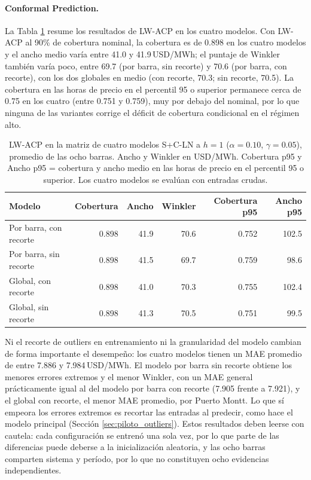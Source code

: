 \paragraph{Conformal Prediction.} La Tabla \ref{tab:matriz_outliers_cp} resume los resultados de LW-ACP en los cuatro modelos. Con LW-ACP al 90\% de cobertura nominal, la cobertura es de 0.898 en los cuatro modelos y el ancho medio varía entre 41.0 y 41.9\,USD/MWh; el puntaje de Winkler también varía poco, entre 69.7 (por barra, sin recorte) y 70.6 (por barra, con recorte), con los dos globales en medio (con recorte, 70.3; sin recorte, 70.5). La cobertura en las horas de precio en el percentil 95 o superior permanece cerca de 0.75 en los cuatro (entre 0.751 y 0.759), muy por debajo del nominal, por lo que ninguna de las variantes corrige el déficit de cobertura condicional en el régimen alto.

\begin{table}[htbp]
    \centering
    \begin{tabular}{lrrrrr}
        \toprule
        Modelo & Cobertura & Ancho & Winkler & Cobertura p95 & Ancho p95 \\
        \midrule
        Por barra, con recorte & 0.898 & 41.9 & 70.6 & 0.752 & 102.5 \\
        Por barra, sin recorte & 0.898 & 41.5 & 69.7 & 0.759 & 98.6 \\
        Global, con recorte    & 0.898 & 41.0 & 70.3 & 0.755 & 102.4 \\
        Global, sin recorte    & 0.898 & 41.3 & 70.5 & 0.751 & 99.5 \\
        \bottomrule
    \end{tabular}
    \vspace{0.2cm}
    \caption{LW-ACP en la matriz de cuatro modelos S+C-LN a $h=1$ ($\alpha=0.10$, $\gamma=0.05$), promedio de las ocho barras. Ancho y Winkler en USD/MWh. Cobertura p95 y Ancho p95 = cobertura y ancho medio en las horas de precio en el percentil 95 o superior. Los cuatro modelos se evalúan con entradas crudas.}
    \label{tab:matriz_outliers_cp}
\end{table}

Ni el recorte de outliers en entrenamiento ni la granularidad del modelo cambian de forma importante el desempeño: los cuatro modelos tienen un MAE promedio de entre 7.886 y 7.984\,USD/MWh. El modelo por barra sin recorte obtiene los menores errores extremos y el menor Winkler, con un MAE general prácticamente igual al del modelo por barra con recorte (7.905 frente a 7.921), y el global con recorte, el menor MAE promedio, por Puerto Montt. Lo que sí empeora los errores extremos es recortar las entradas al predecir, como hace el modelo principal (Sección \ref{sec:piloto_outliers}). Estos resultados deben leerse con cautela: cada configuración se entrenó una sola vez, por lo que parte de las diferencias puede deberse a la inicialización aleatoria, y las ocho barras comparten sistema y período, por lo que no constituyen ocho evidencias independientes.

